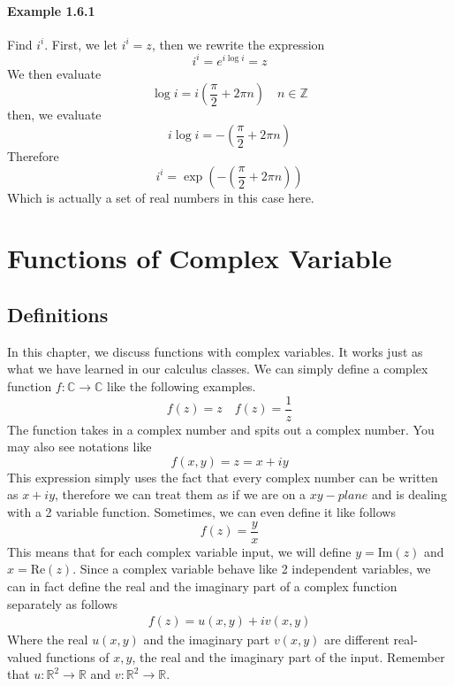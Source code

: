 \documentclass[12pt]{book}
\newcommand{\Z}{\mathbb{Z}}
\newcommand{\R}{\mathbb{R}}
\newcommand{\C}{\mathbb{C}}
\newcommand{\paren}[1]{\left( #1 \right)}
\begin{document}
\subsubsection{Example 1.6.1}
Find $i^i$. First, we let $i^i = z$, then we rewrite the expression
\[
i^i = e^{i \log i } = z
\]
We then evaluate
\[
\log i = i\paren{\frac{\pi}{2}+ 2\pi n} \quad n \in \Z
\]
then, we evaluate
\[
i \log i = -\paren{\frac{\pi}{2}+ 2\pi n}
\]
Therefore
\[
i^i = \exp \paren{-\paren{\frac{\pi}{2}+ 2\pi n}}
\]
Which is actually a set of real numbers in this case here. 





\chapter{Functions of Complex Variable}
\section{Definitions}
In this chapter, we discuss functions with complex variables. It works just as what we have learned in our calculus classes. We can simply define a complex function $f \colon \C \to \C$ like the following examples.
\[
f(z) = z \quad f(z) = \frac{1}{z}
\]
The function takes in a complex number and spits out a complex number. You may also see notations like
\[
f(x,y) = z = x+iy
\]
This expression simply uses the fact that every complex number can be written as $x+iy$, therefore we can treat them as if we are on a $xy-plane$ and is dealing with a 2 variable function. Sometimes, we can even define it like follows
\[
f(z) = \frac{y}{x}
\]
This means that for each complex variable input, we will define $y = \text{Im}(z)$ and $x = \text{Re}(z)$. Since a complex variable behave like 2 independent variables, we can in fact define the real and the imaginary part of a complex function separately as follows
\begin{align}
    f(z) = u(x,y) + iv(x,y)
\end{align}\label{eq:2.1}
Where the real $u(x,y)$ and the imaginary part $v(x,y)$ are different real-valued functions of $x,y$, the real and the imaginary part of the input. Remember that $u \colon \R^2 \to \R$ and $v \colon \R^2 \to \R$.
\end{document}
